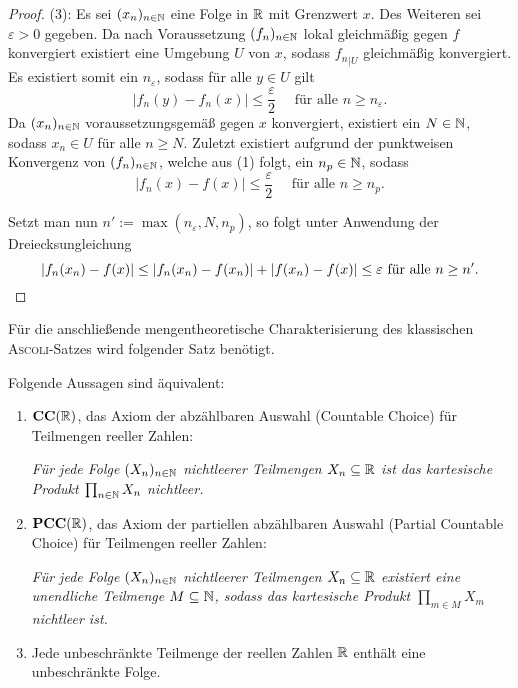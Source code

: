 \begin{proof}
  (3): 
  Es sei $(x_n)_{n \in \mathbb{N}}$ eine Folge in $\mathbb{R}$ mit Grenzwert $x$.
  Des Weiteren sei $\varepsilon > 0$ gegeben.
  Da nach Voraussetzung $(f_n)_{n \in \mathbb{N}}$ lokal gleichmäßig gegen $f$ konvergiert existiert eine Umgebung $U$ von $x$, sodass ${f_n}_{| U}$ gleichmäßig konvergiert.
  Es existiert somit ein $n_\varepsilon$, sodass für alle $y \in U$ gilt 
  \begin{displaymath}
    | f_n(y) - f_n(x) | \leq \frac{\varepsilon}{2} \quad \text{ für alle $n \geq n_\varepsilon$}.
  \end{displaymath}
  Da $(x_n)_{n \in \mathbb{N}}$ voraussetzungsgemäß gegen $x$ konvergiert, existiert ein $N \in \mathbb{N}$, sodass $x_n \in U$ für alle $n \geq N$.
  Zuletzt existiert aufgrund der punktweisen Konvergenz von $(f_n)_{n \in \mathbb{N}}$, welche aus (1) folgt, ein $n_p \in \mathbb{N}$, sodass
  \begin{displaymath}
    | f_n(x) - f(x) | \leq \frac{\varepsilon}{2} \quad \text{ für alle $n \geq n_p$}.
  \end{displaymath}

  Setzt man nun $n':= \max(n_\varepsilon, N, n_p)$, so folgt unter Anwendung der Dreiecksungleichung
  \begin{displaymath}
    | f_n(x_n) - f(x) |
    \leq
    | f_n(x_n) - f(x_n) | + | f(x_n) - f(x) | 
    \leq \varepsilon \text{ für alle $n \geq n'$}. \qedhere
  \end{displaymath}

\end{proof}

Für die anschließende mengentheoretische Charakterisierung des klassischen \textsc{Ascoli}-Satzes wird folgender Satz benötigt.

\begin{thm}
  \label{thm:unboundedsubsetofR}
  Folgende Aussagen sind äquivalent:
  \begin{enumerate}[(1)]
    \item $\mathbf{CC}(\mathbb{R})$, das Axiom der abzählbaren Auswahl (Countable Choice) für Teilmengen reeller Zahlen:
      \begin{addmargin}[2em]{2em}%
        \textit{Für jede Folge $(X_n)_{n \in \mathbb{N}}$ nichtleerer Teilmengen $X_n \subseteq \mathbb{R}$ ist das kartesische Produkt $\prod_{n \in \mathbb{N}} X_n$ nichtleer.}
      \end{addmargin}
    \item $\mathbf{PCC}(\mathbb{R})$, das Axiom der partiellen abzählbaren Auswahl (Partial Countable Choice) für Teilmengen reeller Zahlen: 
      \begin{addmargin}[2em]{2em}%
        \textit{Für jede Folge $(X_n)_{n \in \mathbb{N}}$ nichtleerer Teilmengen $X_n \subseteq \mathbb{R}$ existiert eine unendliche Teilmenge $M \subseteq \mathbb{N}$, sodass das kartesische Produkt $\prod_{m \in M} X_m$ nichtleer ist.}
      \end{addmargin}
    \item Jede unbeschränkte Teilmenge der reellen Zahlen $\mathbb{R}$ enthält eine unbeschränkte Folge.
  \end{enumerate}
\end{thm}

